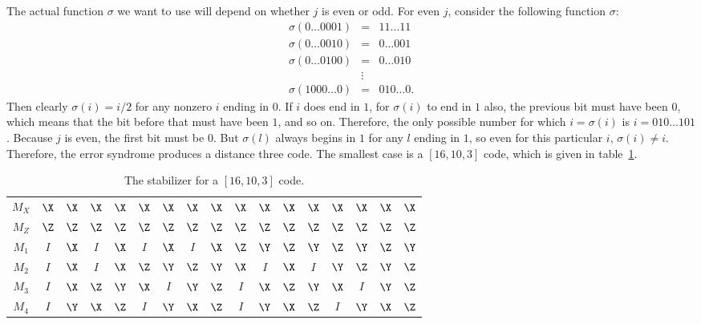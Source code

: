The actual function $\sigma$ we want to use will depend on whether $j$ is
even or odd.  For even $j$, consider the following function $\sigma$:
\begin{eqnarray}
	\sigma (0 \ldots 0 0 0 1) & = & 1 1 \ldots 1 1  \nonumber \\
	\sigma (0 \ldots 0 0 1 0) & = & 0 \ldots 0 0 1 \nonumber \\
	\sigma (0 \ldots 0 1 0 0) & = & 0 \ldots 0 1 0 \label{eq-sigma-even}\\
	& \vdots & \nonumber \\
	\sigma (1 0 0 0 \ldots 0) & = & 0 1 0 \ldots 0. \nonumber
\end{eqnarray}
Then clearly $\sigma (i) = i/2$ for any nonzero $i$ ending in $0$.  If $i$
does end in $1$, for $\sigma (i)$ to end in $1$ also, the previous bit must
have been $0$, which means that the bit before that must have been $1$,
and so on.  Therefore, the only possible number for which $i = \sigma (i)$
is $i = 0 1 0 \ldots 1 0 1$.  Because $j$ is even, the first bit must be $0$.
But $\sigma(l)$ always begins in $1$ for any $l$ ending in $1$, so even for
this particular $i$, $\sigma (i) \neq i$.  Therefore, the error syndrome
produces a distance three code.  The smallest case is a $[16,10,3]$ code, which
is given in table~\ref{table-16qubit}.
\begin{table}
	\centering
	{\setlength{\tabcolsep}{0.4em}
		\begin{tabular}{c|cccccccccccccccc}
			$M_X$ & $\X$ & $\X$ & $\X$ & $\X$ & $\X$ & $\X$ & $\X$ & $\X$ & $\X$
			& $\X$ & $\X$ & $\X$ & $\X$ & $\X$ & $\X$ & $\X$ \\
			$M_Z$ & $\Z$ & $\Z$ & $\Z$ & $\Z$ & $\Z$ & $\Z$ & $\Z$ & $\Z$ & $\Z$ &
			$\Z$ & $\Z$ & $\Z$ & $\Z$ & $\Z$ & $\Z$ & $\Z$ \\
			$M_1$ & $I$ & $\X$ & $I$ & $\X$ & $I$ & $\X$ & $I$ & $\X$ & $\Z$ &
			$\Y$ & $\Z$ & $\Y$ & $\Z$ & $\Y$ & $\Z$ & $\Y$ \\
			$M_2$ & $I$ & $\X$ & $I$ & $\X$ & $\Z$ & $\Y$ & $\Z$ & $\Y$ & $\X$ &
			$I$ & $\X$ & $I$ & $\Y$ & $\Z$ & $\Y$ & $\Z$ \\
			$M_3$ & $I$ & $\X$ & $\Z$ & $\Y$ & $\X$ & $I$ & $\Y$ & $\Z$ & $I$ &
			$\X$ & $\Z$ & $\Y$ & $\X$ & $I$ & $\Y$ & $\Z$ \\
			$M_4$ & $I$ & $\Y$ & $\X$ & $\Z$ & $I$ & $\Y$ & $\X$ & $\Z$ & $I$ &
			$\Y$ & $\X$ & $\Z$ & $I$ & $\Y$ & $\X$ & $\Z$
		\end{tabular}
		\caption{The stabilizer for a $[16,10,3]$ code.}
		\label{table-16qubit}}
\end{table}

